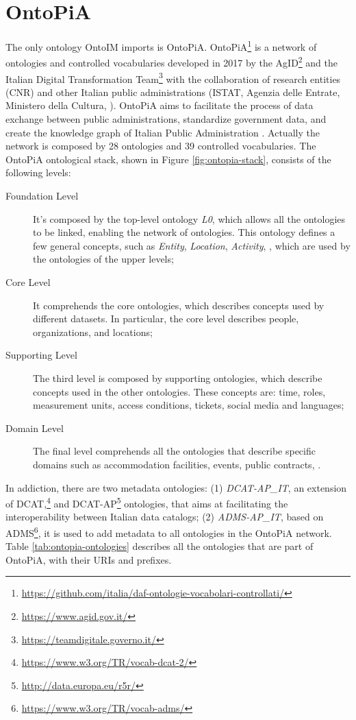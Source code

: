 \section{OntoPiA}
\label{sec:ontopia}

The only ontology \ac{OntoIM} imports is OntoPiA. OntoPiA\footnote{\url{https://github.com/italia/daf-ontologie-vocabolari-controllati/}} is a network of ontologies and controlled vocabularies developed in 2017 by the \ac{AgID}\footnote{\url{https://www.agid.gov.it/}} and the Italian Digital Transformation Team\footnote{\url{https://teamdigitale.governo.it/}} with the collaboration of research entities (CNR) and other Italian public administrations (ISTAT, Agenzia delle Entrate, Ministero della Cultura, \etc). OntoPiA aims to facilitate the process of data exchange between public administrations, standardize government data, and create the knowledge graph of Italian Public Administration \cite{agid2017pt, agid2017lg}. Actually the network is composed by 28 ontologies and 39 controlled vocabularies. The OntoPiA ontological stack, shown in Figure \ref{fig:ontopia-stack}, consists of the following levels:

\begin{description}
  \item[Foundation Level] It's composed by the top-level ontology \textit{L0}, which allows all the ontologies to be linked, enabling the network of ontologies. This ontology defines a few general concepts, such as \textit{Entity}, \textit{Location}, \textit{Activity}, \etc, which are used by the ontologies of the upper levels;
  \item[Core Level] It comprehends the core ontologies, which describes concepts used by different datasets. In particular, the core level describes people, organizations, and locations;
  \item[Supporting Level] The third level is composed by supporting ontologies, which describe concepts used in the other ontologies. These concepts are: time, roles, measurement units, access conditions, tickets, social media and languages;
  \item[Domain Level] The final level comprehends all the ontologies that describe specific domains such as accommodation facilities, events, public contracts, \etc.
\end{description}

In addiction, there are two metadata ontologies: (1) \textit{DCAT-AP\_IT}, an extension of DCAT,\footnote{\url{https://www.w3.org/TR/vocab-dcat-2/}} and DCAT-AP\footnote{\url{http://data.europa.eu/r5r/}} ontologies, that aims at facilitating the interoperability between Italian data catalogs; (2) \textit{ADMS-AP\_IT}, based on ADMS\footnote{\url{https://www.w3.org/TR/vocab-adms/}}, it is used to add metadata to all ontologies in the OntoPiA network. Table \ref{tab:ontopia-ontologies} describes all the ontologies that are part of OntoPiA, with their \acp{URI} and prefixes.


